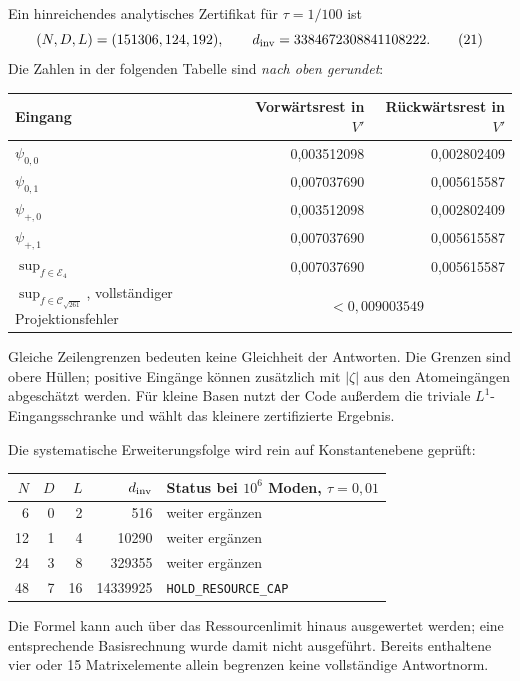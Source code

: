 \documentclass[10pt,a4paper]{article}
\begin{document}
Ein hinreichendes analytisches Zertifikat für $\tau=1/100$ ist
\[
 (N,D,L)=(151306,124,192),\qquad
 d_{\rm inv}=3384672308841108222.                         \tag{21}
\]
Die Zahlen in der folgenden Tabelle sind \emph{nach oben gerundet}:
\begin{center}\begin{tabular}{lrr}\toprule
Eingang & Vorwärtsrest in $V'$ & Rückwärtsrest in $V'$\\\midrule
$\psi_{0,0}$ &0,003512098&0,002802409\\
$\psi_{0,1}$ &0,007037690&0,005615587\\
$\psi_{+,0}$ &0,003512098&0,002802409\\
$\psi_{+,1}$ &0,007037690&0,005615587\\\midrule
$\sup_{f\in\mathcal E_4}$ &0,007037690&0,005615587\\
$\sup_{f\in\mathcal C_{\sqrt{261}}}$, vollständiger Projektionsfehler
 &\multicolumn{2}{c}{$<0{,}009003549$}\\\bottomrule
\end{tabular}\end{center}
Gleiche Zeilengrenzen bedeuten keine Gleichheit der Antworten. Die Grenzen
sind obere Hüllen; positive Eingänge können zusätzlich mit $|\zeta|$ aus den
Atomeingängen abgeschätzt werden. Für kleine Basen nutzt der Code außerdem
die triviale $L^1$-Eingangsschranke und wählt das kleinere zertifizierte Ergebnis.

Die systematische Erweiterungsfolge wird rein auf Konstantenebene geprüft:
\begin{center}\begin{tabular}{rrrrl}\toprule
$N$&$D$&$L$&$d_{\rm inv}$&Status bei $10^6$ Moden, $\tau=0{,}01$\\\midrule
6&0&2&516&weiter ergänzen\\
12&1&4&10290&weiter ergänzen\\
24&3&8&329355&weiter ergänzen\\
48&7&16&14339925&\texttt{HOLD\_RESOURCE\_CAP}\\\bottomrule
\end{tabular}\end{center}
Die Formel kann auch über das Ressourcenlimit hinaus ausgewertet werden;
eine entsprechende Basisrechnung wurde damit nicht ausgeführt. Bereits
enthaltene vier oder 15 Matrixelemente allein begrenzen keine vollständige
Antwortnorm.
\newpage
\end{document}
